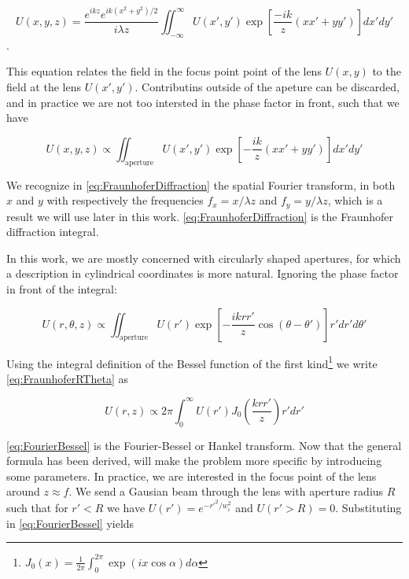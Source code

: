 \begin{mdframed}
    \begin{equation}\label{eq:FraunhoferDiffraction}
        U(x, y, z)=\frac{e^{i k z} e^{i k\left(x^{2}+y^{2}\right)/2}}{i \lambda z} \iint_{-\infty}^{\infty} U(x', y') \exp \left[\frac{-ik}{z}(x x'+y y')\right] dx' dy'
    \end{equation}. 
    
    This equation relates the field in the focus point point of the lens $U(x,y)$ to the field at the lens $U(x',y')$. 
    Contributins outside of the apeture can be discarded, and in practice we are not too intersted in the phase factor in front, such that we have
    
    \begin{equation}\label{eq:FraunhoferSimplified}
        U(x,y,z) \propto 
        \iint_{\text{aperture}} U(x',y') \exp{\left[- \frac{ik}{z}(xx'+yy')\right]}dx'dy'
    \end{equation}
    
    We recognize in \cref{eq:FraunhoferDiffraction} the spatial Fourier transform, in both $x$ and $y$ with respectively the frequencies $f_x = x/\lambda z$ and $f_y = y/\lambda z$, which is a result we will use later in this work. \cref{eq:FraunhoferDiffraction} is the Fraunhofer diffraction integral.
\end{mdframed}

 In this work, we are mostly concerned with circularly shaped apertures, for which a description in cylindrical coordinates is more natural.
 Ignoring the phase factor in front of the integral:

\begin{equation}\label{eq:FraunhoferRTheta}
    U(r,\theta, z) \propto \iint_{\text{aperture}} U(r') \exp{\left[
    -\frac{i k r r'}{z} \cos{(\theta-\theta')} 
    \right]}r'dr'd\theta'
\end{equation}

Using the integral definition of the Bessel function of the first kind\footnote{$J_0(x) = \frac{1}{2\pi} \int_0^{2\pi} \exp{(i x \cos{\alpha})} d\alpha$} we write \cref{eq:FraunhoferRTheta} as 

\begin{equation}\label{eq:FourierBessel}
    U(r,z) \propto 2\pi \int_0^{\infty} U(r') J_0\left( \frac{k r r'}{z}\right) r'dr'
\end{equation}

\cref{eq:FourierBessel} is the Fourier-Bessel or Hankel transform.
Now that the general formula has been derived, will make the problem more specific by introducing some parameters. 
In practice, we are interested in the focus point of the lens around $z \approx f$. 
We send a Gausian beam through the lens with aperture radius $R$ such that for $r' <R$ we have $U(r')=e^{-r'^2/w_i^2}$ and $U(r'>R)=0$.
Substituting in \cref{eq:FourierBessel} yields

